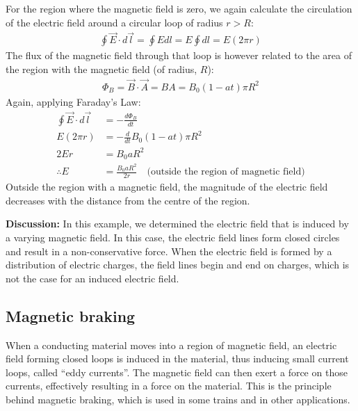 \begin{example}
For the region where the magnetic field is zero, we again calculate the circulation of the electric field around a circular loop of radius $r>R$:
\begin{align*}
\oint \vec E \cdot d\vec l = \oint Edl = E \oint dl = E(2\pi r)
\end{align*}
The flux of the magnetic field through that loop is however related to the area of the region with the magnetic field (of radius, $R$):
\begin{align*}
\Phi_B = \vec B \cdot \vec A = BA = B_0(1-at) \pi R^2
\end{align*}
Again, applying Faraday's Law:
\begin{align*}
\oint \vec E\cdot d\vec l &= -\frac{d\Phi_B}{dt}\\
E(2\pi r) &= -\frac{d}{dt} B_0(1-at) \pi R^2\\
2Er&=  B_0aR^2\\
\therefore E&=\frac{B_0aR^2}{2r}\quad\text{(outside the region of magnetic field)}
\end{align*}
Outside the region with a magnetic field, the magnitude of the electric field decreases with the distance from the centre of the region.

\textbf{Discussion:} In this example, we determined the electric field that is induced by a varying magnetic field. In this case, the electric field lines form closed circles and result in a non-conservative force. When the electric field is formed by a distribution of electric charges, the field lines begin and end on charges, which is not the case for an induced electric field.
\end{example}
\subsection{Magnetic braking}
When a conducting material moves into a region of magnetic field, an electric field forming closed loops is induced in the material, thus inducing small current loops, called ``eddy currents''. The magnetic field can then exert a force on those currents, effectively resulting in a force on the material. This is the principle behind magnetic braking, which is used in some trains and in other applications.

